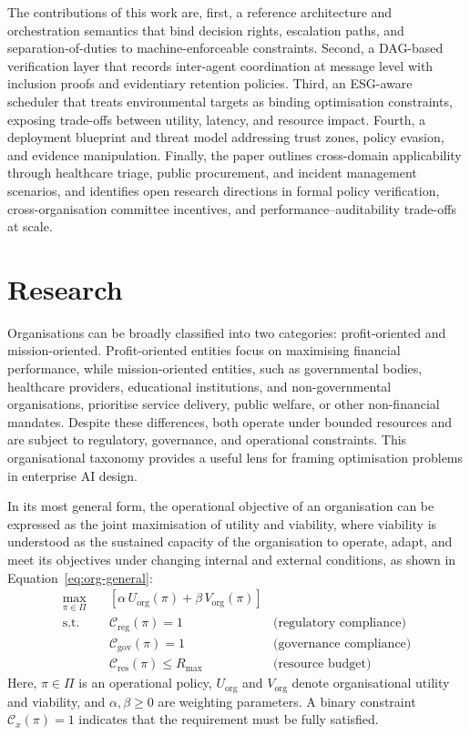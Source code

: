 \documentclass[oneside,10pt]{swissi}
\begin{document}
The contributions of this work are, first, a reference architecture and orchestration semantics that bind decision rights, escalation paths, and separation-of-duties to machine-enforceable constraints. Second, a DAG-based verification layer that records inter-agent coordination at message level with inclusion proofs and evidentiary retention policies. Third, an ESG-aware scheduler that treats environmental targets as binding optimisation constraints, exposing trade-offs between utility, latency, and resource impact. Fourth, a deployment blueprint and threat model addressing trust zones, policy evasion, and evidence manipulation. Finally, the paper outlines cross-domain applicability through healthcare triage, public procurement, and incident management scenarios, and identifies open research directions in formal policy verification, cross-organisation committee incentives, and performance–auditability trade-offs at scale.

\section{Research}\label{sec4}
Organisations can be broadly classified into two categories: profit-oriented and mission-oriented. Profit-oriented entities focus on maximising financial performance, while mission-oriented entities, such as governmental bodies, healthcare providers, educational institutions, and non-governmental organisations, prioritise service delivery, public welfare, or other non-financial mandates. Despite these differences, both operate under bounded resources and are subject to regulatory, governance, and operational constraints. This organisational taxonomy provides a useful lens for framing optimisation problems in enterprise AI design.

In its most general form, the operational objective of an organisation can be expressed as the joint maximisation of utility and viability, where viability is understood as the sustained capacity of the organisation to operate, adapt, and meet its objectives under changing internal and external conditions, as shown in Equation~\eqref{eq:org-general}:
\begin{align}
\max_{\pi \in \Pi} \quad & \left[ \alpha \, U_{\text{org}}(\pi) + \beta \, V_{\text{org}}(\pi) \right] \label{eq:org-general} \\
\text{s.t.} \quad
& \mathcal{C}_{\text{reg}}(\pi) = 1 & \text{(regulatory compliance)} \nonumber \\
& \mathcal{C}_{\text{gov}}(\pi) = 1 & \text{(governance compliance)} \nonumber \\
& \mathcal{C}_{\text{res}}(\pi) \leq R_{\max} & \text{(resource budget)} \nonumber
\end{align}
Here, $\pi \in \Pi$ is an operational policy, $U_{\text{org}}$ and $V_{\text{org}}$ denote organisational utility and viability, and $\alpha, \beta \geq 0$ are weighting parameters. A binary constraint $\mathcal{C}_x(\pi) = 1$ indicates that the requirement must be fully satisfied.
\end{document}
